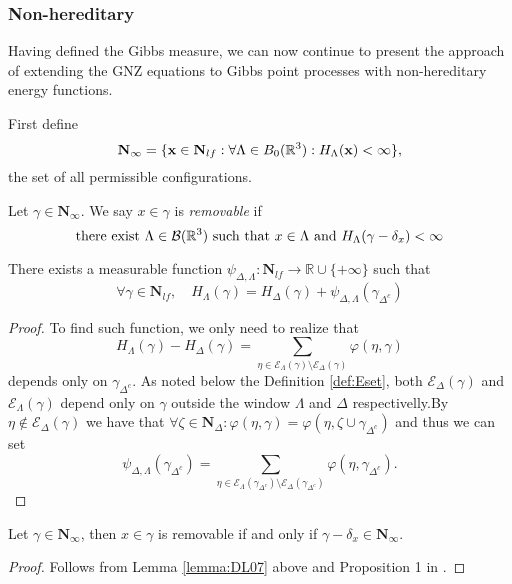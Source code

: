 \subsubsection{Non-hereditary}\label{sec:non-hereditary}
Having defined the Gibbs measure, we can now continue to present the approach of \cite{DereudreLavancier2007} extending the GNZ equations to Gibbs point processes with non-hereditary energy functions.

First define 
$$\mathbf N_\infty = \{{\mathbf{x}} \in \mathbf N_{lf}: \forall \Lambda \in B_0({\mathbb R^3}): H_\Lambda({\mathbf{x}})< \infty\},$$
the set of all permissible configurations.

\begin{definition}
	Let $\gamma \in \mathbf N_\infty$. We say $x\in\gamma$ is \textit{removable} if 
	$$\text{there exist } \Lambda \in \mathcal B({\mathbb R^3}) \text{ such that } x\in\Lambda \text{ and } H_\Lambda(\gamma - \delta_x)<\infty$$
\end{definition}


\begin{lemma}\label{lemma:DL07}
	There exists a measurable function $\psi_{\Delta,\Lambda}:\mathbf N_{lf}\to \mathbb R\cup\{+\infty\}$ such that
	$$\forall \gamma \in \mathbf N_{lf},\quad H_\Lambda(\gamma) = H_\Delta(\gamma) + \psi_{\Delta,\Lambda}(\gamma_{\Delta^c})$$
\end{lemma}
\begin{proof}
	To find such function, we only need to realize that
	$$H_\Lambda(\gamma) - H_\Delta(\gamma) = \sum_{\eta \in \mathcal E_\Lambda(\gamma) \setminus \mathcal E_\Delta(\gamma)} \varphi(\eta,\gamma)$$
	depends only on $\gamma_{\Delta^c}$. As noted below the Definition \ref{def:Eset}, both $\mathcal E_\Delta(\gamma)$ and $\mathcal E_\Lambda(\gamma)$ depend only on $\gamma$ outside the window $\Lambda$ and $\Delta$ respectivelly.By $\eta \notin \mathcal E_{\Delta}(\gamma)$ we have that $\forall \zeta \in \mathbf N_\Delta: \varphi(\eta,\gamma)=\varphi(\eta,\zeta \cup \gamma_{\Delta^c})$ and thus we can set
	$$\psi_{\Delta,\Lambda}(\gamma_{\Delta^c}) = \sum_{\eta \in \mathcal E_\Lambda(\gamma_{\Delta^c}) \setminus \mathcal E_\Delta(\gamma_{\Delta^c})} \varphi(\eta,\gamma_{\Delta^c}).$$
\end{proof}



\begin{proposition}
	Let $\gamma \in \mathbf N_\infty$, then $x\in\gamma$ is removable if and only if $\gamma - \delta_x \in \mathbf N_\infty$.
\end{proposition}
\begin{proof}
	Follows from Lemma \ref{lemma:DL07} above and Proposition 1 in \cite{DereudreLavancier2007}.	
\end{proof}


